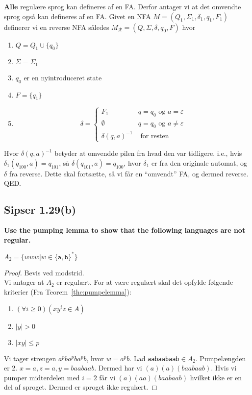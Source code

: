 \textbf{Alle} regulære sprog kan defineres af en FA. Derfor antager vi at det omvendte sprog også kan defineres af en FA. Givet en NFA $M = (Q_{1}, \Sigma_{1}, \delta_{1}, q_{1}, F_{1})$ definerer vi en reverse NFA således $M_{\mathcal{R}} = (Q, \Sigma, \delta, q_{0}, F)$ hvor
\begin{enumerate}
  \item $Q = Q_{1} \cup \{q_{0}\}$
  \item $\Sigma = \Sigma_{1}$
  \item $q_{0}$ er en nyintroduceret state
  \item $F = \{q_{1}\}$
  \item
        \begin{equation*}
          \delta =
\begin{cases}
  F_{1} & q = q_{0} \text{ og } a = \varepsilon \\
  \emptyset & q = q_{0} \text{ og } a \neq \varepsilon \\
  \delta(q,a)^{-1} & \text{ for resten}
\end{cases}
        \end{equation*}
\end{enumerate}
Hvor $\delta(q,a)^{-1}$ betyder at omvendde pilen fra hvad den var tidligere, i.e., hvis $\delta_{1}(q_{100},a) = q_{101}$, så $\delta(q_{101}, a) = q_{100}$, hvor $\delta_{1}$ er fra den originale automat, og $\delta$ fra reverse. Dette skal fortsætte, så vi får en ``omvendt'' FA, og dermed reverse. QED.

\subsection*{Sipser 1.29(b)}%
\label{subsec:label}

\textbf{Use the pumping lemma to show that the following languages are not regular.}

$A_{2} = \{www|w \in \{\mathtt{a,b}\}^{*}\}$

\begin{proof}
  Bevis ved modstrid.\\
  Vi antager at $A_{2}$ er regulært. For at være regulært skal det opfylde følgende kriterier (Fra Teorem~\ref{the:pumpelemma}):
  \begin{enumerate}
    \item $(\forall i \geq 0)(xy^{i}z \in A)$
    \item $|y| > 0$
    \item $|xy| \leq p$
  \end{enumerate}

  Vi tager strengen $a^{p}ba^{p}ba^{p}b$, hvor $w = a^{p}b$. Lad \texttt{aabaabaab}$\in A_{2}$. Pumpelængden er 2. $x = a, z = a, y = baabaab$. Dermed har vi $(a)(a)(baabaab)$. Hvis vi pumper midterdelen med $i = 2$ får vi $(a)(aa)(baabaab)$ hvilket ikke er en del af sproget. Dermed er sproget ikke regulært.
\end{proof}


